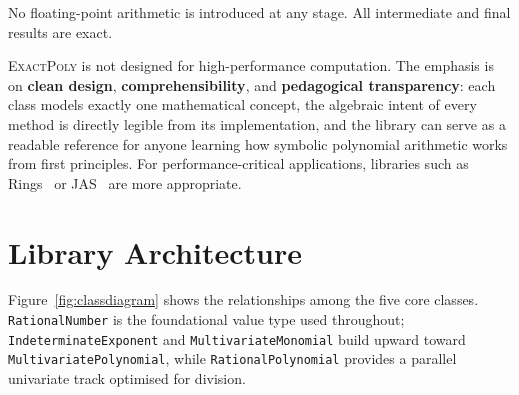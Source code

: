 \documentclass[11pt,a4paper]{article}
\begin{document}
No floating-point arithmetic is introduced at any stage.
All intermediate and final results are exact.

\textsc{ExactPoly} is not designed for high-performance computation.
The emphasis is on \textbf{clean design}, \textbf{comprehensibility}, and
\textbf{pedagogical transparency}: each class models exactly one mathematical
concept, the algebraic intent of every method is directly legible from its
implementation, and the library can serve as a readable reference for anyone
learning how symbolic polynomial arithmetic works from first principles.
For performance-critical applications, libraries such as
Rings~\cite{poslavsky2019} or JAS~\cite{kredel2008} are more appropriate.

\section{Library Architecture}

Figure~\ref{fig:classdiagram} shows the relationships among the five core
classes. \texttt{RationalNumber} is the foundational value type used throughout;
\texttt{IndeterminateExponent} and \texttt{MultivariateMonomial} build upward
toward \texttt{MultivariatePolynomial}, while \texttt{RationalPolynomial}
provides a parallel univariate track optimised for division.
\end{document}
